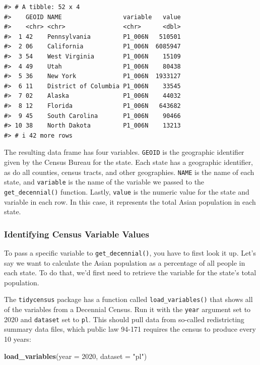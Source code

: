 \documentclass[
]{book}
\newenvironment{Shaded}{\begin{snugshade}}{\end{snugshade}}
\newcommand{\AttributeTok}[1]{\textcolor[rgb]{0.13,0.29,0.53}{#1}}
\newcommand{\DecValTok}[1]{\textcolor[rgb]{0.00,0.00,0.81}{#1}}
\newcommand{\FunctionTok}[1]{\textcolor[rgb]{0.13,0.29,0.53}{\textbf{#1}}}
\newcommand{\NormalTok}[1]{#1}
\newcommand{\StringTok}[1]{\textcolor[rgb]{0.31,0.60,0.02}{#1}}
\begin{document}
\begin{verbatim}
#> # A tibble: 52 x 4
#>    GEOID NAME                 variable   value
#>    <chr> <chr>                <chr>      <dbl>
#>  1 42    Pennsylvania         P1_006N   510501
#>  2 06    California           P1_006N  6085947
#>  3 54    West Virginia        P1_006N    15109
#>  4 49    Utah                 P1_006N    80438
#>  5 36    New York             P1_006N  1933127
#>  6 11    District of Columbia P1_006N    33545
#>  7 02    Alaska               P1_006N    44032
#>  8 12    Florida              P1_006N   643682
#>  9 45    South Carolina       P1_006N    90466
#> 10 38    North Dakota         P1_006N    13213
#> # i 42 more rows
\end{verbatim}

The resulting data frame has four variables. \texttt{GEOID} is the geographic identifier given by the Census Bureau for the state. Each state has a geographic identifier, as do all counties, census tracts, and other geographies. \texttt{NAME} is the name of each state, and \texttt{variable} is the name of the variable we passed to the \texttt{get\_decennial()} function. Lastly, \texttt{value} is the numeric value for the state and variable in each row. In this case, it represents the total Asian population in each state.

\hypertarget{identifying-census-variable-values}{%
\subsubsection*{Identifying Census Variable Values}\label{identifying-census-variable-values}}

To pass a specific variable to \texttt{get\_decennial()}, you have to first look it up. Let's say we want to calculate the Asian population as a percentage of all people in each state. To do that, we'd first need to retrieve the variable for the state's total population.

The \texttt{tidycensus} package has a function called \texttt{load\_variables()} that shows all of the variables from a Decennial Census. Run it with the \texttt{year} argument set to 2020 and \texttt{dataset} set to \texttt{pl}. This should pull data from so-called redistricting summary data files, which public law 94-171 requires the census to produce every 10 years:

\begin{Shaded}
\begin{Highlighting}[]
\FunctionTok{load\_variables}\NormalTok{(}\AttributeTok{year =} \DecValTok{2020}\NormalTok{, }
               \AttributeTok{dataset =} \StringTok{"pl"}\NormalTok{)}
\end{Highlighting}
\end{Shaded}
\end{document}
